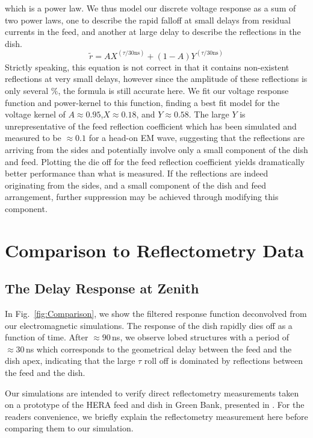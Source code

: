 \documentclass[onecolumn]{emulateapj}
\begin{document}
which is a power law. We thus model our discrete voltage response as a sum of two power laws, one to describe the rapid falloff at small delays from residual currents in the feed, and another at large delay to describe the reflections in the dish. 
\begin{equation}
\widetilde{r} = A X^{(\tau/30\text{ns})} + (1-A) Y^{(\tau/30 \text{ns})}
\end{equation}
Strictly speaking, this equation is not correct in that it contains non-existent reflections at very small delays, however since the amplitude of these reflections is only several $\%$, the formula is still accurate here. 
We fit our voltage response function and power-kernel to this function, finding a best fit model for the voltage kernel of $A\approx0.95$,$X \approx 0.18$, and $Y\approx 0.58$. The large $Y$ is unrepresentative of the feed reflection coefficient which has been simulated and measured to be $\approx 0.1$ for a head-on EM wave, suggesting that the reflections are arriving from the sides and potentially involve only a small component of the dish and feed. Plotting the die off for the feed reflection coefficient yields dramatically better performance than what is measured.  If the reflections are indeed originating from the sides, and a small component of the dish and feed arrangement, further suppression may be achieved through modifying this component. 


\section{Comparison to Reflectometry Data}\label{sec:Comparison}
\subsection{The Delay Response at Zenith}
In Fig.~\ref{fig:Comparison}, we show the filtered response function deconvolved from our electromagnetic simulations. The response of the dish rapidly dies off as a function of time. After $\approx90$\,ns, we observe lobed structures with a period of $\approx 30$\,ns which corresponds to the geometrical delay between the feed and the dish apex, indicating that the large $\tau$ roll off is dominated by reflections between the feed and the dish. 

Our simulations are intended to verify direct reflectometry measurements taken on a prototype of the HERA feed and dish in Green Bank, presented in \citep{Patra:2015}. For the readers convenience, we briefly explain the reflectometry measurement here before comparing them to our simulation.   
\end{document}
